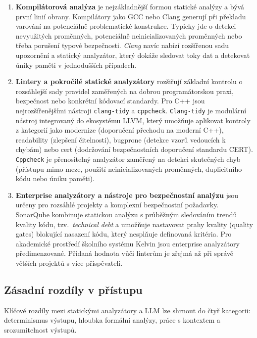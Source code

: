 \begin{enumerate}
    \item \textbf{Kompilátorová analýza} je nejzákladnější formou statické analýzy a bývá první linií obrany.
    Kompilátory jako GCC nebo Clang generují při překladu varování na potenciálně problematické konstrukce.
    Typicky jde o detekci nevyužitých proměnných, potenciálně neinicializovaných proměnných nebo třeba porušení typové bezpečnosti.
    \textit{Clang} navíc nabízí rozšířenou sadu upozornění a statický analyzátor, který dokáže sledovat toky dat a detekovat úniky paměti v jednodušších případech.

    \item \textbf{Lintery a pokročilé statické analyzátory} rozšiřují základní kontrolu o rozsáhlejší sady pravidel zaměřených na dobrou programátorskou praxi, bezpečnost nebo konkrétní kódovací standardy.
    Pro C++ jsou nejrozšířenějšími nástroji \texttt{clang-tidy} a \texttt{cppcheck}.
    \texttt{Clang-tidy} je modulární nástroj integrovaný do ekosystému LLVM, který umožňuje aplikovat kontroly z kategorií jako modernize (doporučení přechodu na moderní C++), readability (zlepšení čitelnosti), bugprone (detekce vzorů vedoucích k chybám) nebo cert (dodržování bezpečnostních doporučení standardu CERT).
    \texttt{Cppcheck} je přenositelný analyzátor zaměřený na detekci skutečných chyb (přístupu mimo meze, použití neinicializovaných proměnných, duplicitního kódu nebo úniku paměti).

    \item \textbf{Enterprise analyzátory a nástroje pro bezpečnostní analýzu} jsou určeny pro rozsáhlé projekty a komplexní bezpečnostní požadavky.
    SonarQube kombinuje statickou analýzu s průběžným sledováním trendů kvality kódu, tzv.\ \textit{technical debt} a umožňuje nastavovat prahy kvality (quality gates) blokující nasazení kódu, který nesplňuje definovaná kritéria.
    Pro akademické prostředí školního systému Kelvin jsou enterprise analyzátory předimenzované.
    Přidaná hodnota vůči linterům je zřejmá až při správě větších projektů s více přispěvateli.
\end{enumerate}

\subsection{Zásadní rozdíly v přístupu}
\label{subsec:static-vs-llm-differences}

Klíčové rozdíly mezi statickými analyzátory a LLM lze shrnout do čtyř kategorii: determinismus výstupu, hloubka formální analýzy, práce s kontextem a srozumitelnost výstupů.

